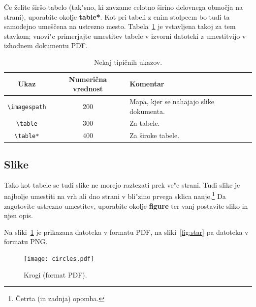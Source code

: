 \documentclass[sigconf,nonacm]{acmart}
\begin{document}
Če želite širšo tabelo (tak"sno, ki zavzame celotno širino delovnega območja
na strani), uporabite okolje \textbf{table*}.  Kot pri tabeli z enim stolpcem
bo tudi ta samodejno umeščena na ustrezno mesto.  Tabela~\ref{tab:table2} je
vstavljena takoj za tem stavkom; vnovi"c primerjajte umestitev tabele v
izvorni datoteki z umestitvijo v izhodnem dokumentu PDF\@.

\begin{table}
    \centering
    \caption{Nekaj tipičnih ukazov.}
    \label{tab:table2}
    \begin{tabular}{ccl}
        \toprule
        Ukaz&Numerična vrednost&Komentar\\
        \midrule
        \texttt{\textbackslash{}imagespath} & 200 & Mapa, kjer se nahajajo slike dokumenta. \\
        \texttt{\textbackslash{}table} & 300 & Za tabele.\\
        \texttt{\textbackslash{}table*} & 400& Za široke tabele.\\
        \bottomrule
    \end{tabular}
\end{table}

\subsection{Slike}

Tako kot tabele se tudi slike ne morejo raztezati prek ve"c strani. Tudi slike
je najbolje umestiti na vrh ali dno strani v bli"zino prvega sklica
nanje.\footnote{Četrta (in zadnja) opomba.}  Da zagotovite ustrezno umestitev,
uporabite okolje \textbf{figure} ter vanj postavite sliko in njen opis.

Na sliki~\ref{fig:circles} je prikazana datoteka v formatu PDF, na
sliki~\ref{fig:star} pa datoteka v formatu PNG\@.

\begin{figure}
    \centering
    \texttt{[image: circles.pdf]}
    \caption{Krogi (format PDF).}
    \label{fig:circles}
\end{figure}
\end{document}
